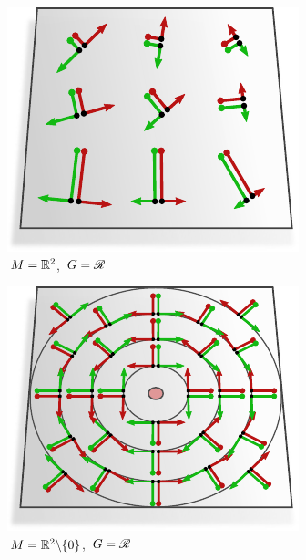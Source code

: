 \hfill
\begin{subfigure}[b]{0.26\textwidth}
	\centering
	\includegraphics[width=1.\textwidth]{figures/G_structure_R2_6_big.pdf}
	\captionsetup{format=hang}
	\caption{\small
		\,$M = \mathbb{R}^2$,
		\,$G = \mathscr{R}$
	}
	\label{fig:G_structure_intro_e}
\end{subfigure}
\hfill
\begin{subfigure}[b]{0.26\textwidth}
	\centering
	\includegraphics[width=1.\textwidth]{figures/G_structure_R2_no_origin_O2_intro.pdf}
	\captionsetup{format=hang}
	\caption{\small
		\,$M = \mathbb{R}^2\backslash\{0\}$,
		\,$G = \mathscr{R}$
	}
	\label{fig:G_structure_intro_f}
\end{subfigure}
